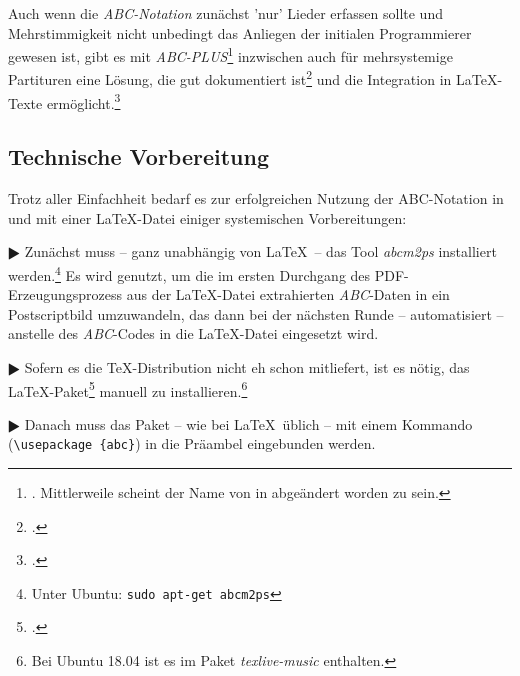 Auch wenn die \textit{ABC-Notation} zunächst 'nur' Lieder erfassen sollte und
Mehrstimmigkeit nicht unbedingt das Anliegen der initialen Programmierer gewesen
ist, gibt es mit \textit{ABC-PLUS}\footnote{\cite[vgl.][\nopage
wp]{Gonzato2018a}. Mittlerweile scheint der Name von  in
 abgeändert worden zu sein.} inzwischen auch für mehrsystemige
Partituren eine Lösung, die gut dokumentiert
ist\footcite[vgl.][XVff]{Gonzato2018b} und die Integration in \LaTeX-Texte
ermöglicht.\footcite[vgl.][134]{Gonzato2018b}

\subsection{Technische Vorbereitung}

Trotz aller Einfachheit bedarf es zur erfolgreichen Nutzung der ABC-Notation
in und mit einer \LaTeX-Datei einiger systemischen Vorbereitungen:

$\RHD$ Zunächst muss -- ganz unabhängig von \LaTeX\ -- das Tool \textit{abcm2ps}
installiert werden.\footnote{Unter Ubuntu: \texttt{sudo apt-get abcm2ps}} Es
wird genutzt, um die im  ersten Durchgang des PDF-Erzeugungsprozess aus der
\LaTeX-Datei extrahierten \textit{ABC}-Daten in ein Postscriptbild
umzuwandeln, das dann bei der nächsten Runde -- automatisiert -- anstelle des
\textit{ABC}-Codes in die \LaTeX-Datei eingesetzt wird.
  
$\RHD$ Sofern es die \TeX-Distribution nicht eh schon mitliefert, ist es nötig,
das \LaTeX-Paket\footcite[vgl.][\nopage wp]{CtanAbc2018a} manuell zu
installieren.\footnote{Bei Ubuntu 18.04 ist es im Paket \textit{texlive-music}
enthalten.}
  
$\RHD$ Danach muss das Paket -- wie bei \LaTeX\ üblich -- mit einem Kommando
(\texttt{\textbackslash{usepackage} \{abc\}}) in die Präambel eingebunden werden.
  
